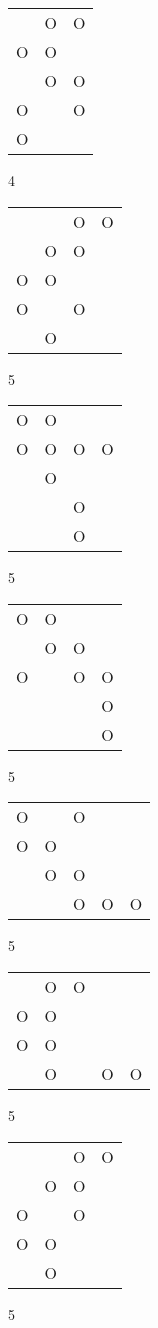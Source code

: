 \begin{tabular}{|m{0.2cm}m{0.2cm}m{0.2cm}|}\hline
 &O&O\\
O&O& \\
 &O&O\\
O& &O\\
O& & \\
\hline\end{tabular}4
\begin{tabular}{|m{0.2cm}m{0.2cm}m{0.2cm}m{0.2cm}|}\hline
 & &O&O\\
 &O&O& \\
O&O& & \\
O& &O& \\
 &O& & \\
\hline\end{tabular}5
\begin{tabular}{|m{0.2cm}m{0.2cm}m{0.2cm}m{0.2cm}|}\hline
O&O& & \\
O&O&O&O\\
 &O& & \\
 & &O& \\
 & &O& \\
\hline\end{tabular}5
\begin{tabular}{|m{0.2cm}m{0.2cm}m{0.2cm}m{0.2cm}|}\hline
O&O& & \\
 &O&O& \\
O& &O&O\\
 & & &O\\
 & & &O\\
\hline\end{tabular}5
\begin{tabular}{|m{0.2cm}m{0.2cm}m{0.2cm}m{0.2cm}m{0.2cm}|}\hline
O& &O& & \\
O&O& & & \\
 &O&O& & \\
 & &O&O&O\\
\hline\end{tabular}5
\begin{tabular}{|m{0.2cm}m{0.2cm}m{0.2cm}m{0.2cm}m{0.2cm}|}\hline
 &O&O& & \\
O&O& & & \\
O&O& & & \\
 &O& &O&O\\
\hline\end{tabular}5
\begin{tabular}{|m{0.2cm}m{0.2cm}m{0.2cm}m{0.2cm}|}\hline
 & &O&O\\
 &O&O& \\
O& &O& \\
O&O& & \\
 &O& & \\
\hline\end{tabular}5
